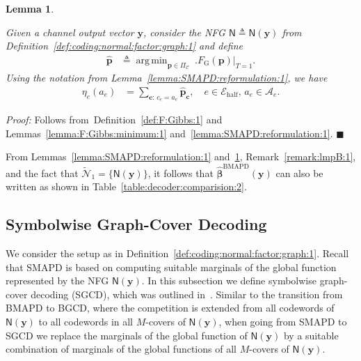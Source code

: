 \documentclass[journal, twocolumn]{IEEEtran}
\renewcommand{\mathbf}[1]{{\bm{#1}}}
\newcommand{\vect}[1]{\mathbf{#1}}
\newcommand{\code}[1]{\mathcal{#1}}
\newcommand{\set}[1]{\mathcal{#1}}
\newcommand{\graph}[1]{\mathsf{#1}}
\DeclareMathOperator*{\argmin}{arg\,min}
\newcommand{\defeq}{\triangleq}
\newcommand{\codeC}{\code{C}}
\newcommand{\bel}{\beta}
\newcommand{\hvbel}{\boldsymbol{\hat \bel}}
\newcommand{\setA}{\set{A}}
\newcommand{\setEhalf}{\set{E}_{\mathrm{half}}}
\newcommand{\vc}{\vect{c}}
\newcommand{\vp}{\vect{p}}
\newcommand{\BMAPD}{\mathrm{BMAPD}}
\newcommand{\vy}{\vect{y}}
\newcommand{\graphN}{\graph{N}}
\newcommand{\cover}[1]{\tilde{#1}}
\newcommand{\cset}[1]{\cover{\set{#1}}}
\newcommand{\?}{\mathrm{?}}
\newcommand{\qedblack}{\hspace*{\fill}%
  $\blacksquare$\smallskip}
\newcommand{\FGibbs}{F_{\mathrm{G}}}
\newcommand{\setPi}{\Pi}
\newtheorem{Lemma}{Lemma}
\newenvironment{Proof}%
  {\noindent \emph{Proof:}}{\qedblack}
\begin{document}
\begin{Lemma}
  \label{lemma:SMAPD:reformulation:2}

  Given a channel output vector $\vy$, consider the NFG $\graphN \defeq
  \graphN(\vy)$ from Definition~\ref{def:coding:normal:factor:graph:1} and
  define
  \begin{align*}
    \hat \vp
      &\defeq
         \argmin_{\vp \in \setPi_\codeC} \ 
           \Big.
             \FGibbs(\vp)
           \Big|_{T = 1}.
  \end{align*}
  Using the notation from Lemma~\ref{lemma:SMAPD:reformulation:1}, we have
  \begin{align*}
    \eta_e(a_e)
      &= \sum_{\vc: \, c_e = a_e}
           \hat \vp_{\vc},
           \quad e \in \setEhalf, \, a_e \in \setA_e.
  \end{align*}
\end{Lemma}


\begin{Proof}
  Follows from~Definition~\ref{def:F:Gibbs:1} and
  Lemmas~\ref{lemma:F:Gibbs:minimum:1} and~\ref{lemma:SMAPD:reformulation:1}.
\end{Proof}


From Lemmas~\ref{lemma:SMAPD:reformulation:1}
and~\ref{lemma:SMAPD:reformulation:2}, Remark~\ref{remark:lmpB:1}, and the
fact that $\cset{N}_1 = \bigl\{ \graphN(\vy) \bigr\}$, it follows that
$\hvbel^{\BMAPD}(\vy)$ can also be written as shown in
Table~\ref{table:decoder:comparision:2}.


\subsection{Symbolwise Graph-Cover Decoding}
\label{sec:SGCD:1}


We consider the setup as in Definition~\ref{def:coding:normal:factor:graph:1}.
Recall that SMAPD is based on computing suitable marginals of the global
function represented by the NFG $\graphN(\vy)$. In this subsection we define
symbolwise graph-cover decoding (SGCD), which was outlined
in~\cite{Vontobel:08:3, Vontobel:09:Talk:5}. Similar to the transition from
BMAPD to BGCD, where the competition is extended from all codewords of
$\graphN(\vy)$ to all codewords in all $M$-covers of $\graphN(\vy)$, when
going from SMAPD to SGCD we replace the marginals of the global function of
$\graphN(\vy)$ by a suitable combination of marginals of the global functions
of all $M$-covers of $\graphN(\vy)$.
\end{document}
